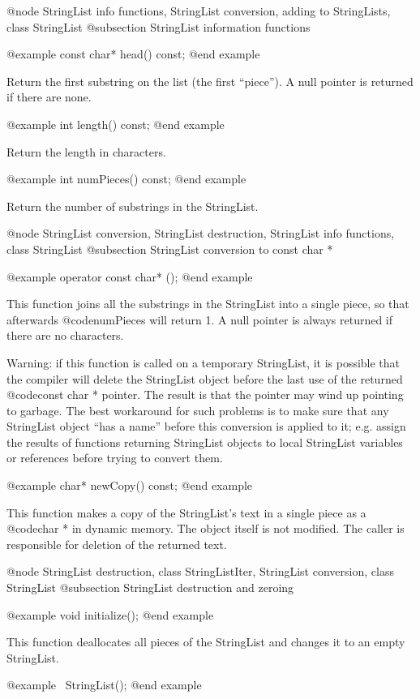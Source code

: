 @node StringList info functions, StringList conversion, adding to StringLists, class StringList
@subsection StringList information functions

@example
const char* head() const;
@end example

Return the first substring on the list (the first ``piece'').  A null
pointer is returned if there are none.

@example
int length() const;
@end example

Return the length in characters.

@example
int numPieces() const;
@end example

Return the number of substrings in the StringList.

@node StringList conversion, StringList destruction, StringList info functions, class StringList
@subsection StringList conversion to const char *

@example
operator const char* ();
@end example

This function joins all the substrings in the StringList into a
single piece, so that afterwards @code{numPieces} will return 1.
A null pointer is always returned if there are no characters.

Warning: if this function is called on a temporary StringList, it
is possible that the compiler will delete the StringList object
before the last use of the returned @code{const char *} pointer.
The result is that the pointer may wind up pointing to garbage.
The best workaround for such problems is to make sure that any
StringList object ``has a name'' before this conversion is applied
to it; e.g. assign the results of functions returning StringList
objects to local StringList variables or references before trying
to convert them.

@example
char* newCopy() const;
@end example

This function makes a copy of the StringList's text in a single piece
as a @code{char *} in dynamic memory.  The object itself is not modified.
The caller is responsible for deletion of the returned text.

@node StringList destruction, class StringListIter, StringList conversion, class StringList
@subsection StringList destruction and zeroing

@example
void initialize();
@end example

This function deallocates all pieces of the StringList and changes
it to an empty StringList.

@example
~StringList();
@end example

